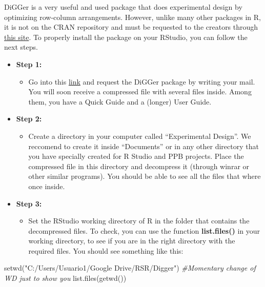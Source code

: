 \documentclass[
]{book}
\newenvironment{Shaded}{\begin{snugshade}}{\end{snugshade}}
\newcommand{\CommentTok}[1]{\textcolor[rgb]{0.56,0.35,0.01}{\textit{#1}}}
\newcommand{\FunctionTok}[1]{\textcolor[rgb]{0.00,0.00,0.00}{#1}}
\newcommand{\NormalTok}[1]{#1}
\newcommand{\StringTok}[1]{\textcolor[rgb]{0.31,0.60,0.02}{#1}}
\providecommand{\tightlist}{%
  \setlength{\itemsep}{0pt}\setlength{\parskip}{0pt}}
\begin{document}
DiGGer is a very useful and used package that does experimental design by optimizing row-column arrangements. However, unlike many other packages in R, it is not on the CRAN repository and must be requested to the creators through \href{http://nswdpibiom.org/austatgen/software/}{this site}. To properly install the package on your RStudio, you can follow the next steps.

\begin{itemize}
\item
  \textbf{Step 1:}

  \begin{itemize}
  \tightlist
  \item
    Go into this \href{http://nswdpibiom.org/austatgen/software/}{link} and request the DiGGer package by writing your mail. You will soon receive a compressed file with several files inside. Among them, you have a Quick Guide and a (longer) User Guide.
  \end{itemize}
\item
  \textbf{Step 2:}

  \begin{itemize}
  \tightlist
  \item
    Create a directory in your computer called ``Experimental Design''. We reccomend to create it inside ``Documents'' or in any other directory that you have specially created for R Studio and PPB projects. Place the compressed file in this directory and decompress it (through winrar or other similar programs). You should be able to see all the files that where once inside.
  \end{itemize}
\item
  \textbf{Step 3: }

  \begin{itemize}
  \tightlist
  \item
    Set the RStudio working directory of R in the folder that contains the decompressed files. To check, you can use the function \textbf{list.files()} in your working directory, to see if you are in the right directory with the required files. You should see something like this:
  \end{itemize}
\end{itemize}

\begin{Shaded}
\begin{Highlighting}[]
\FunctionTok{setwd}\NormalTok{(}\StringTok{"C:/Users/Usuario1/Google Drive/RSR/Digger"}\NormalTok{) }\CommentTok{\#Momentary change of  WD just to show you}
 \FunctionTok{list.files}\NormalTok{(}\FunctionTok{getwd}\NormalTok{())}
\end{Highlighting}
\end{Shaded}
\end{document}
